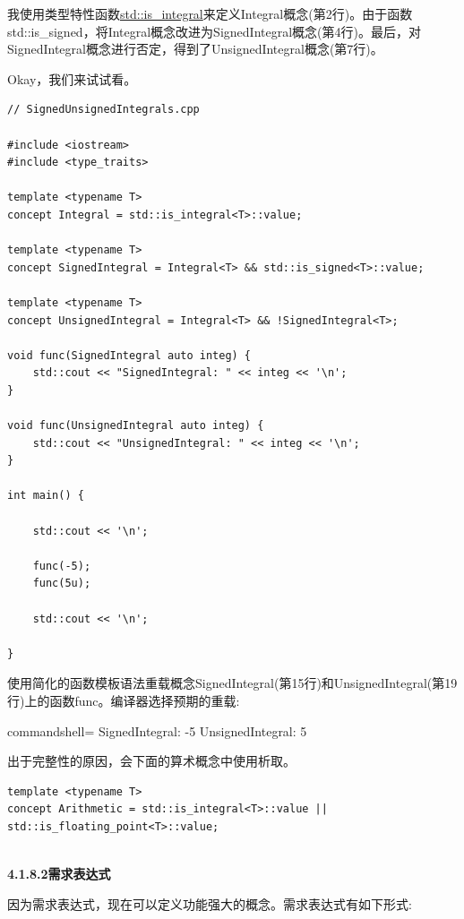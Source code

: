 我使用类型特性函数\href{https://en.cppreference.com/w/cpp/types/is_integral}{std::is\_integral}来定义Integral概念(第2行)。由于函数std::is\_signed，将Integral概念改进为SignedIntegral概念(第4行)。最后，对SignedIntegral概念进行否定，得到了UnsignedIntegral概念(第7行)。

Okay，我们来试试看。

\begin{lstlisting}[style=styleCXX]
// SignedUnsignedIntegrals.cpp

#include <iostream>
#include <type_traits>

template <typename T>
concept Integral = std::is_integral<T>::value;

template <typename T>
concept SignedIntegral = Integral<T> && std::is_signed<T>::value;

template <typename T>
concept UnsignedIntegral = Integral<T> && !SignedIntegral<T>;

void func(SignedIntegral auto integ) {
	std::cout << "SignedIntegral: " << integ << '\n';
}

void func(UnsignedIntegral auto integ) {
	std::cout << "UnsignedIntegral: " << integ << '\n';
}

int main() {

	std::cout << '\n';

	func(-5);
	func(5u);

	std::cout << '\n';

}
\end{lstlisting}

使用简化的函数模板语法重载概念SignedIntegral(第15行)和UnsignedIntegral(第19行)上的函数func。编译器选择预期的重载:

\begin{tcblisting}{commandshell={}}
SignedIntegral: -5
UnsignedIntegral: 5
\end{tcblisting}

出于完整性的原因，会下面的算术概念中使用析取。

\begin{lstlisting}[style=styleCXX]
template <typename T>
concept Arithmetic = std::is_integral<T>::value || std::is_floating_point<T>::value;
\end{lstlisting}

\hspace*{\fill} \\ %
\noindent
\textbf{4.1.8.2\hspace{0.2cm}需求表达式}

因为需求表达式，现在可以定义功能强大的概念。需求表达式有如下形式:

